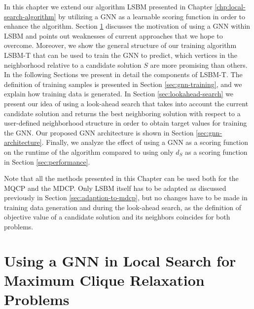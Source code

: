 \documentclass[draft,final]{vutinfth} %
\begin{document}
In this chapter we extend our algorithm LSBM presented in Chapter \ref{chp:local-search-algorithm} by utilizing a GNN as a learnable scoring function in order to enhance the algorithm. 
Section \ref{sec:gnn-local-search} discusses the motivation of using a GNN within LSBM and points out weaknesses of current approaches that we hope to overcome. Moreover, we show the general structure of our training algorithm LSBM-T that can be used to train the GNN to predict, which vertices in the neighborhood relative to a candidate solution $S$ are more promising than others. 
In the following Sections we present in detail the components of LSBM-T. The definition of training samples is presented in Section \ref{sec:gnn-training}, and we explain how training data is generated.  
In Section \ref{sec:lookahead-search} we present our idea of using a look-ahead search that takes into account the current candidate solution and returns the best neighboring solution with respect to a user-defined neighborhood structure in order to obtain target values for training the GNN. 
Our proposed GNN architecture is shown in Section \ref{sec:gnn-architecture}. 
Finally, we analyze the effect of using a GNN as a scoring function on the runtime of the algorithm compared to using only $d_S$ as a scoring function in Section \ref{sec:performance}. 

Note that all the methods presented in this Chapter can be used both for the MQCP and the MDCP. Only LSBM itself has to be adapted as discussed previously in Section \ref{sec:adaption-to-mdcp}, but no changes have to be made in training data generation and during the look-ahead search, as the definition of objective value of a candidate solution and its neighbors coincides for both problems. 

\section{Using a GNN in Local Search for Maximum Clique Relaxation Problems}\label{sec:gnn-local-search}
\end{document}

